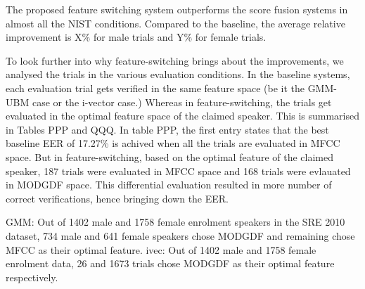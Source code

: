 \documentclass{article}
\begin{document}


The proposed feature switching system outperforms the score fusion systems in
almost all the NIST conditions. Compared to the baseline, the average relative
improvement is X\% for male trials and Y\% for female trials.

To look further into why feature-switching brings about the improvements, we
analysed the trials in the various evaluation conditions. In the baseline
systems, each evaluation trial gets verified in the same feature space (be it
the GMM-UBM case or the i-vector case.) Whereas in feature-switching, the trials
get evaluated in the optimal feature space of the claimed speaker. This is
summarised in Tables PPP and QQQ. %
In table PPP, the first entry states that the best baseline EER of 17.27\% is achived when
all the trials are evaluated in MFCC space. But in feature-switching, based on
the optimal feature of the claimed speaker, 187 trials were evaluated in MFCC
space and 168 trials were evlauated in MODGDF space. This differential
evaluation resulted in more number of correct verifications, hence bringing down
the EER.

GMM:
Out of 1402 male  and 1758 female enrolment speakers in the SRE 2010
dataset, 734 male  and 641 female speakers chose MODGDF and 
remaining chose MFCC as their optimal feature.
 ivec:
Out of 1402 male and 1758 female enrolment data, 26 and 1673
trials chose MODGDF as their optimal feature respectively.
\end{document}
